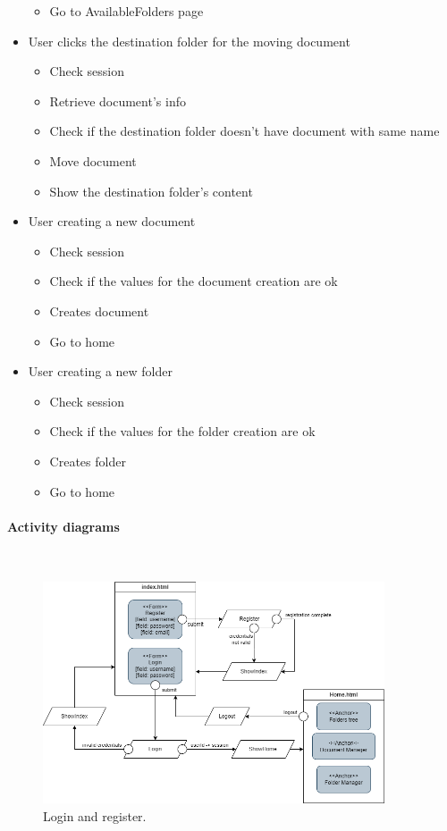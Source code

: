 \documentclass[a4paper,12pt]{article}
\newcommand{\myparagraph}[1]{\paragraph{#1}\mbox{}\\}
\begin{document}
\begin{multicols}{2}
\begin{itemize}
\begin{itemize}
		\item{Go to AvailableFolders page}
	\end{itemize}
	\item{User clicks the destination folder for the moving document}
	\begin{itemize}
		\item{Check session}
		\item{Retrieve document's info}
		\item{Check if the destination folder doesn't have document with same name}
		\item{Move document}
		\item{Show the destination folder's content}
	\end{itemize}
	\item{User creating a new document}
	\begin{itemize}
		\item{Check session}
		\item{Check if the values for the document creation are ok}
		\item{Creates document}
		\item{Go to home}
	\end{itemize}	
	\item{User creating a new folder}
	\begin{itemize}
		\item{Check session}
		\item{Check if the values for the folder creation are ok}
		\item{Creates folder}
		\item{Go to home}
	\end{itemize}
		
\end{itemize}
\end{multicols}
\newpage
\myparagraph{Activity diagrams}
\begin{figure}[H]
    \centering
    \includegraphics[width=0.9\textwidth]{HTML/HTMLLogin.png}
    \caption{Login and register.}
\end{figure}
\end{document}
